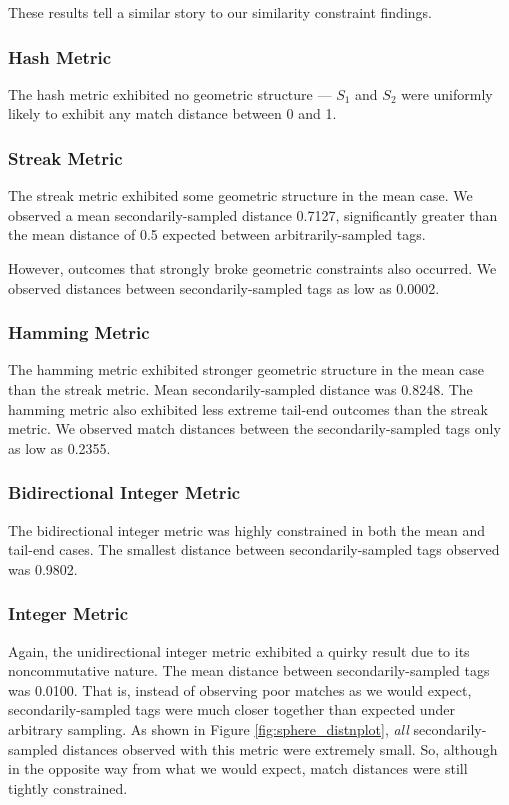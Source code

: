 These results tell a similar story to our similarity constraint findings.

\subsubsection{Hash Metric}
The hash metric exhibited no geometric structure --- $S_1$ and $S_2$ were uniformly likely to exhibit any match distance between 0 and 1.

\subsubsection{Streak Metric}

The streak metric exhibited some geometric structure in the mean case. We observed a mean secondarily-sampled distance 0.7127, significantly greater than the mean distance of 0.5 expected between arbitrarily-sampled tags.

However, outcomes that strongly broke geometric constraints also occurred.
We observed distances between secondarily-sampled tags as low as 0.0002.

\subsubsection{Hamming Metric}

The hamming metric exhibited stronger geometric structure in the mean case than the streak metric.
Mean secondarily-sampled distance was 0.8248.
The hamming metric also exhibited less extreme tail-end outcomes than the streak metric.
We observed match distances between the secondarily-sampled tags only as low as 0.2355.

\subsubsection{Bidirectional Integer Metric}

The bidirectional integer metric was highly constrained in both the mean and tail-end cases.
The smallest distance between secondarily-sampled tags observed was 0.9802.

\subsubsection{Integer Metric}

Again, the unidirectional integer metric exhibited a quirky result due to its noncommutative nature.
The mean distance between secondarily-sampled tags was 0.0100.
That is, instead of observing poor matches as we would expect, secondarily-sampled tags were much closer together than expected under arbitrary sampling.
As shown in Figure \ref{fig:sphere_distnplot}, \textit{all} secondarily-sampled distances observed with this metric were extremely small.
So, although in the opposite way from what we would expect, match distances were still tightly constrained.

